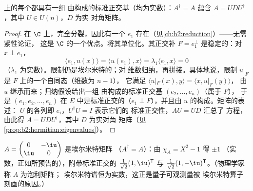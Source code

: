 \begin{theorem}[埃尔米特谱定理]\label{thm:b2:hermitian:spectral}
上的每个都具有一组
由构成的标准正交基（均为实数）：$A^\dagger = A$
蕴含 $A = U D U^{\dagger}$，其中 $U \in U(n)$，$D$ 为实
对角矩阵。
\end{theorem}

\begin{proof}
在 $\C$ 上，完全分裂，因此有一个
$e_1$ 存在（见\cref{ch:b2:reduction}）——无需紧性论证，
这是 $\C$ 的一个优点。将其单位化。其正交补
$F = e_1^\perp$ 是稳定的：对 $x \perp e_1$，
\[
\langle e_1, u(x)\rangle = \langle u(e_1), x\rangle
= \lambda_1\langle e_1, x\rangle = 0
\]
（$\lambda_1$ 为实数）。限制仍是埃尔米特的；对
维数归纳，再拼接。具体地说，限制 $u|_F$ 是
 $F$ 上的一个自同态（维数为 $n - 1$），
它满足 $\langle u|_F(x), y\rangle = \langle x, u|_F(y)\rangle$，
由 $u$ 继承而来；归纳假设给出一组
由构成的标准正交基 $(e_2, \dots, e_n)$（属于 $F$），
于是 $(e_1, e_2, \dots, e_n)$ 在 $E$ 中是标准正交的（$e_1 \perp
F$），并且由 $u$ 的构成。矩阵的表述：
$U$ 的各列即 $e_i$，$U^\dagger U = I$ 表示它们的
标准正交性，$AU = UD$ 汇总了
方程，由此得 $A = UDU^\dagger$，其中 $D$ 为实对角
矩阵（见\cref{prop:b2:hermitian:eigenvalues}）。
\end{proof}

\begin{example}\label{ex:b2:hermitian:pauli}
$A = \begin{pmatrix} 0 & -\iu\\ \iu & 0\end{pmatrix}$ 是埃尔米特矩阵
（$A^\dagger = A$）：由 $\chi_A = X^2 - 1$ 得 $\pm 1$
（实数，正如所预告的），附带标准正交的
$\frac{1}{\sqrt2}(1, \iu)^{\mathsf T}$ 与 $\frac{1}{\sqrt2}(1,
-\iu)^{\mathsf T}$。（物理学家称 $A$ 为泡利矩阵；
埃尔米特谱恒为实数，这正是量子可观测量被
埃尔米特算子刻画的原因。）
\end{example}

